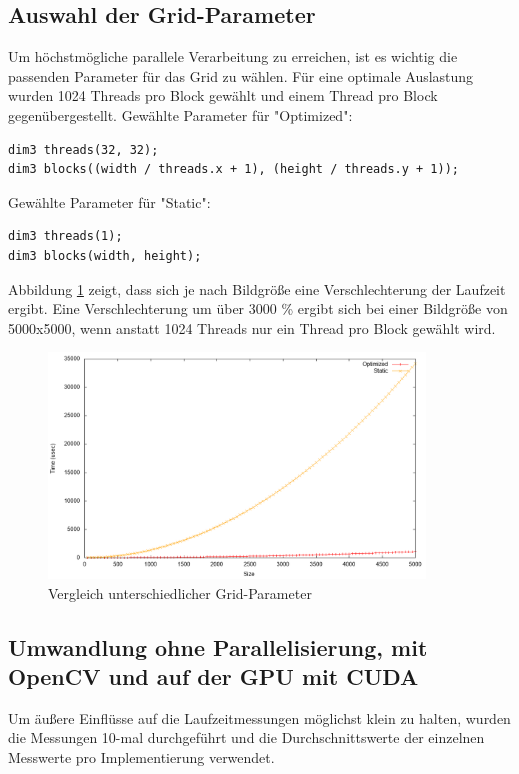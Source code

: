 \documentclass{llncs}
\begin{document}
%
\subsection{Auswahl der Grid-Parameter}
%

Um höchstmögliche parallele Verarbeitung zu erreichen, ist es wichtig die passenden Parameter für das Grid zu wählen. Für eine optimale Auslastung wurden 1024 Threads pro Block gewählt und einem Thread pro Block gegenübergestellt.
\newpage
Gewählte Parameter für "Optimized":
\begin{lstlisting}
dim3 threads(32, 32);
dim3 blocks((width / threads.x + 1), (height / threads.y + 1));
\end{lstlisting}

Gewählte Parameter für "Static":
\begin{lstlisting}
dim3 threads(1);
dim3 blocks(width, height);
\end{lstlisting}

Abbildung \ref{fig:analysis_grids} zeigt, dass sich je nach Bildgröße eine Verschlechterung der Laufzeit ergibt. Eine Verschlechterung um über 3000 \% ergibt sich bei einer Bildgröße von 5000x5000, wenn anstatt 1024 Threads nur ein Thread pro Block gewählt wird.

\begin{figure}
	\centering
	\includegraphics[width=10cm,keepaspectratio]{analysis_grids.png}
	\caption{Vergleich unterschiedlicher Grid-Parameter}
	\label{fig:analysis_grids}
\end{figure}


%
\subsection{Umwandlung ohne Parallelisierung, mit OpenCV und auf der GPU mit CUDA}
%

Um äußere Einflüsse auf die Laufzeitmessungen möglichst klein zu halten, wurden die Messungen 10-mal durchgeführt und die Durchschnittswerte der einzelnen Messwerte pro Implementierung verwendet.\\
\end{document}
